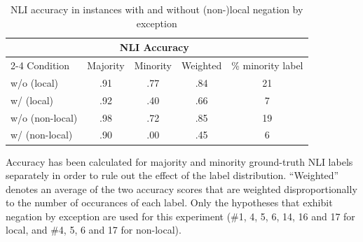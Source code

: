 \begin{table}[t]
    \centering
    \begin{threeparttable}
        \centering
        \fontsize{8pt}{10pt}\selectfont
        \setlength{\tabcolsep}{3pt}
        \renewcommand{\arraystretch}{.6}
        \begin{tabular}{lcccc}\toprule
             & \multicolumn{3}{c}{NLI Accuracy} & \\\cmidrule{2-4}
            Condition & Majority & Minority & Weighted & \% minority label \\\midrule
            w/o (local) & .91 & .77 & .84 & 21 \\
            w/ (local) & .92 &  .40 & .66 & 7 \\
            \midrule
            w/o (non-local) & .98 & .72 & .85 & 19 \\
            w/ (non-local) & .90 & .00 & .45 & 6  \\
            \bottomrule
        \end{tabular}
        \makeatletter\def\TPT@hsize{}\makeatletter
        \begin{tablenotes}
            \raggedright
            \fontsize{7pt}{7pt}\selectfont
            Accuracy has been calculated for majority and minority ground-truth NLI labels separately in order to rule out the effect of the label distribution. ``Weighted'' denotes an average of the two accuracy scores that are weighted disproportionally to the number of occurances of each label. Only the hypotheses that exhibit negation by exception are used for this experiment (\#1, 4, 5, 6, 14, 16 and 17 for local, and \#4, 5, 6 and 17 for non-local).
        \end{tablenotes}
    \end{threeparttable}
    \caption{NLI accuracy in instances with and without (non-)local negation by exception}\label{tab:experiment-exception}
\end{table}
